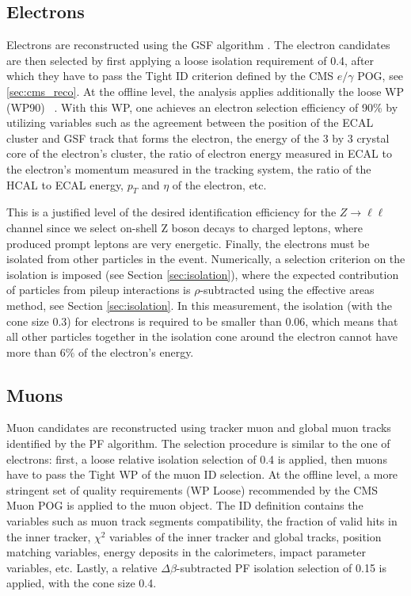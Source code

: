 \subsection{Electrons}\label{sec:electrons}
Electrons are reconstructed using the GSF algorithm \cite{GSF}. The electron candidates are then selected by first applying a loose isolation requirement of 0.4, after which they have to pass the Tight ID criterion defined by the CMS $e/\gamma$ POG, see \ref{sec:cms_reco}. At the offline level, the analysis applies additionally the loose WP (WP90) ~\cite{vhbbAN}. With this WP, one achieves an electron selection efficiency of 90\% by utilizing variables such as the agreement between the position of the ECAL cluster and GSF track that forms the electron, the energy of the 3 by 3 crystal core of the electron's cluster, the ratio of electron energy measured in ECAL to the electron's momentum measured in the tracking system, the ratio of the HCAL to ECAL energy, $p_T$ and $\eta$ of the electron, etc.

This is a justified level of the desired identification efficiency for the $Z \to \ell \ell$ channel since we select on-shell Z boson decays to charged leptons, where produced prompt leptons are very energetic. Finally, the electrons must be isolated from other particles in the event. Numerically, a selection criterion on the isolation is imposed (see Section \ref{sec:isolation}), where the expected contribution of particles from pileup interactions is $\rho$-subtracted using the effective areas method, see Section \ref{sec:isolation}. In this measurement, the isolation (with the cone size 0.3) for electrons is required to be smaller than 0.06, which means that all other particles together in the isolation cone around the electron cannot have more than 6$\%$ of the electron's energy.

\subsection{Muons}\label{sec:muons}
Muon candidates are reconstructed using tracker muon and global muon tracks identified by the PF algorithm. The selection procedure is similar to the one of electrons: first, a loose relative isolation selection of 0.4 is applied, then muons have to pass the Tight WP of the muon ID selection. At the offline level, a more stringent set of quality requirements (WP Loose) recommended by the CMS Muon POG is applied to the muon object. The ID definition contains the variables such as muon track segments compatibility, the fraction of valid hits in the inner tracker, $\chi^2$ variables of the inner tracker and global tracks, position matching variables, energy deposits in the calorimeters, impact parameter variables, etc. Lastly, a relative $\Delta\beta$-subtracted PF isolation selection of 0.15 is applied, with the cone size 0.4.


